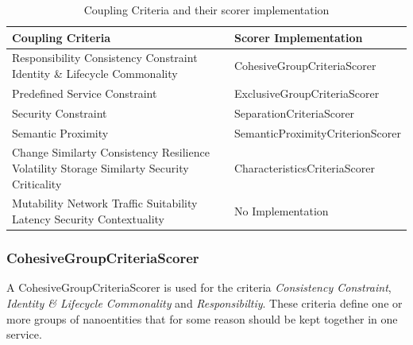 \begin{table}[H]
	\centering
	\caption{Coupling Criteria and their scorer implementation}
	\label{tab:scorer}
	\begin{tabular}{|p{170pt}|p{200pt}|}
		\hline	
		\textbf{Coupling Criteria} & \textbf{Scorer Implementation}  \\
		\hline
		Responsibility \newline Consistency Constraint \newline Identity \& Lifecycle Commonality  & CohesiveGroupCriteriaScorer \\
		\hline
		Predefined Service Constraint  & ExclusiveGroupCriteriaScorer \\ 
		\hline
		Security Constraint & SeparationCriteriaScorer \\
		\hline
		Semantic Proximity & SemanticProximityCriterionScorer \\
		\hline
		Change Similarty \newline Consistency \newline Resilience \newline Volatility \newline Storage Similarty \newline Security Criticality & CharacteristicsCriteriaScorer  \\
		\hline
		Mutability \newline Network Traffic Suitability \newline Latency \newline Security Contextuality & No Implementation  \\
		\hline
	\end{tabular}
\end{table}





\subsubsection{CohesiveGroupCriteriaScorer}

A CohesiveGroupCriteriaScorer is used for the criteria \textit{Consistency Constraint}, \textit{Identity \& Lifecycle Commonality} and \textit{Responsibiltiy}. These criteria define one or more groups of nanoentities that for some reason should be kept together in one service.

